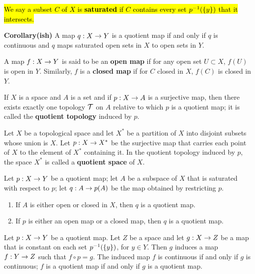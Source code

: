\dfn \hl{We say a subset $C$ of $X$ is \textbf{saturated} if $C$ contains every set $p^{-1}(\{y\})$ that it intersects.}

\textbf{Corollary(ish)} A map $q:X\rightarrow Y$ is a quotient map if and only if $q$ is continuous and $q$ maps saturated open sets in $X$ to open sets in $Y$.

\dfn A map $f:X\rightarrow Y$ is said to be an \textbf{open map} if for any open set $U\subset X$, $f(U)$ is open in $Y$. Similarly, $f$ is a \textbf{closed map} if for $C$ closed in $X$, $f(C)$ is closed in $Y$.

\dfn If $X$ is a space and $A$ is a set and if $p:X\rightarrow A$ is a surjective map, then there exists exactly one topology $\mathcal{T}$ on $A$ relative to which $p$ is a quotient map; it is called the \textbf{quotient topology} induced by $p$.

\dfn Let $X$ be a topological space and let $X^*$ be a partition of $X$ into disjoint subsets whose union is $X$. Let $p:X\rightarrow X^*$ be the surjective map that carries each point of $X$ to the element of $X^*$ containing it. In the quotient topology induced by $p$, the space $X^*$ is called a \textbf{quotient space} of $X$.

\vs

\begin{thm}
Let $p:X\rightarrow Y$ be a quotient map; let $A$ be a subspace of $X$ that is saturated with respect to $p$; let $q:A\rightarrow p(A)$ be the map obtained by restricting $p$.
\begin{enumerate}
    \item If $A$ is either open or closed in $X$, then $q$ is a quotient map.
    \item If $p$ is either an open map or a closed map, then $q$ is a quotient map.
\end{enumerate}
\end{thm}

\vs

\begin{thm}
Let $p:X\rightarrow Y$ be a quotient map. Let $Z$ be a space and let $g:X\rightarrow Z$ be a map that is constant on each set $p^{-1}(\{y\})$, for $y\in Y$. Then $g$ induces a map $f:Y\rightarrow Z$ such that $f\circ p = g$. The induced map $f$ is continuous if and only if $g$ is continuous; $f$ is a quotient map if and only if $g$ is a quotient map.

\begin{center}
\end{center}
\end{thm}

